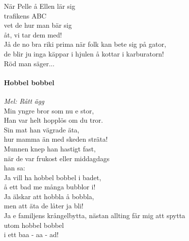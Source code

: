 \documentclass[12pt]{article}
\begin{document}
\hspace{0.1\textwidth}
\noindent
\begin{minipage}{0.45\textwidth}
	
	\noindent
	När Pelle å Ellen lär sig\\
	trafikens ABC\\
	vet de hur man bär sig\\
	åt, vi tar dem med!\\

	\noindent
	Jå de no bra riki prima när folk kan bete sig på gator,\\
	de blir ju inga käppar i hjulen å kottar i karburatorn!\\

	Röd man säger...\\

	
	\paragraph*{Hobbel bobbel\\}
	\vspace{3px}
	\textit{Mel: Rått ägg}\\
	
	\noindent
	Min yngre bror som nu e stor,\\
	Han var helt hopplös om du tror.\\
	Sin mat han vägrade äta,\\
	hur mamma än med skeden sträta!\\
	Munnen knep han hastigt fast,\\
	när de var frukost eller middagdags\\
	han sa:\\
	
	\noindent
	Ja vill ha hobbel bobbel i badet,\\
	å ett bad me många bubblor i!\\
	Ja älskar att hobbla å bobbla,\\
	men att äta de låter ja bli!\\
	Ja e familjens krångelbytta,
	nästan allting får mig att spytta\\
	utom hobbel bobbel\\
	i ett baa - aa - ad!\\
	\vspace{5.35cm}
	
\end{minipage}

\newpage
\end{document}
